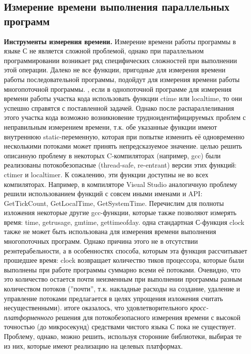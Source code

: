 { %
	\subsection{Измерение времени выполнения параллельных программ}
	\par\textbf{Инструменты измерения времени.} Измерение времени работы программы в языке С не является сложной проблемой, однако при параллельном программировании возникает ряд специфических сложностей при выполнении этой операции. Далеко не все функции, пригодные для измерения времени работы последовательной программы, подойдут для измерения времени работы многопоточной программы. 
	, если в однопоточной программе для измерения времени работы участка кода использовать функции ctime или localtime, то они успешно справятся с поставленной задачей. Однако после распараллеливания этого участка кода возможно возникновение трудноидентифицируемых проблем с неправильным измерением времени, т.к. обе указанные функции имеют внутреннюю static-переменную, которая при попытке изменить её одновременно несколькими потоками может принять непредсказуемое значение.
	 целью решить описанную проблему в некоторых C-компиляторах (например, gcc) были реализованы потокобезопасные (thread-safe, re-entrant) версии этих функций: ctime\textunderscore r и localtime\textunderscore r. К сожалению, эти функции доступны не во всех компиляторах. Например, в компиляторе Visual Studio аналогичную проблему решили использованием функций с совсем иными именами и API: GetTickCount, GetLocalTime, GetSystemTime. Перечислим для полноты изложения некоторые другие gcc-функции, которые также позволяют измерять время: time, getrusage, gmtime, gettimeofday.
	 одна стандартная С-функция clock также не может быть использована для измерения времени выполнения многопоточных программ. Однако причина этого не в отсутствии реэнтерабельности, а в особенностях способа, которым эта функция рассчитывает прошедшее время: clock возвращает количество тиков процессора, которые были выполнены при работе программы суммарно всеми её потоками. Очевидно, что это количество остается почти неизменным при выполнении программы разным количеством потоков (''почти'', т.к. накладные расходы на создание, удаление и управление потоками предлагается в целях упрощения изложения считать несущественными).
	 итоге оказалось, что удовлетворительного \textit{кросс-платформенного} решения для потокобезопасного измерения времени с высокой точностью (до микросекунд) средствами чистого языка С пока не существует. Проблему, однако, можно решить, используя сторонние библиотеки, выбирая те из них, которые имеют реализацию на целевых платформах. 
}

